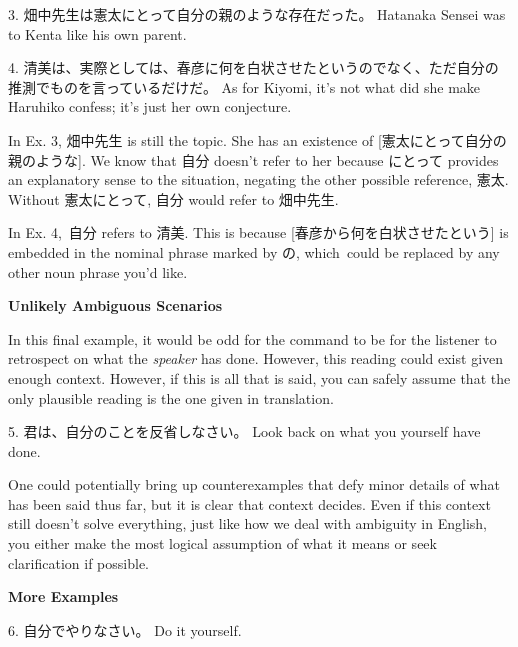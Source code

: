 \par{3. 畑中先生は憲太にとって自分の親のような存在だった。 \hfill\break
Hatanaka Sensei was to Kenta like his own parent. }

\par{4. 清美は、実際としては、春彦に何を白状させたというのでなく、ただ自分の推測でものを言っているだけだ。 \hfill\break
As for Kiyomi, it's not what did she make Haruhiko confess; it's just her own conjecture. }

\par{ In Ex. 3, 畑中先生 is still the topic. She has an existence of [憲太にとって自分の親のような]. We know that 自分 doesn't refer to her because にとって provides an explanatory sense to the situation, negating the other possible reference, 憲太. Without 憲太にとって, 自分 would refer to 畑中先生. }

\par{ In Ex. 4, 自分 refers to 清美. This is because [春彦から何を白状させたという] is embedded in the nominal phrase marked by の, which could be replaced by any other noun phrase you'd like. }

\begin{center}
 \textbf{Unlikely Ambiguous Scenarios }
\end{center}

\par{ In this final example, it would be odd for the command to be for the listener to retrospect on what the \emph{speaker }has done. However, this reading could exist given enough context. However, if this is all that is said, you can safely assume that the only plausible reading is the one given in translation. }

\par{5. 君は、自分のことを反省しなさい。 \hfill\break
Look back on what you yourself have done. }

\par{ One could potentially bring up counterexamples that defy minor details of what has been said thus far, but it is clear that context decides. Even if this context still doesn't solve everything, just like how we deal with ambiguity in English, you either make the most logical assumption of what it means or seek clarification if possible. }

\begin{center}
\textbf{More Examples }
\end{center}

\par{6. 自分でやりなさい。 \hfill\break
Do it yourself. }

